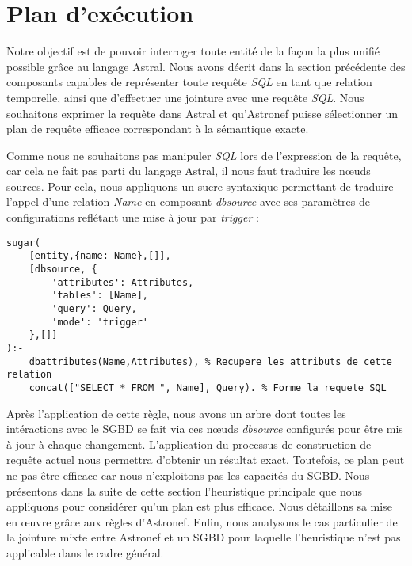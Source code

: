 \section{Plan d'exécution}\label{sec:contrib:asteroid:reecriture}
Notre objectif est de pouvoir interroger toute entité de la façon la plus unifié possible grâce au langage Astral. Nous avons décrit dans la section précédente des composants capables de représenter toute requête \textit{SQL} en tant que relation temporelle, ainsi que d'effectuer une jointure avec une requête \textit{SQL}. Nous souhaitons exprimer la requête dans Astral et qu'Astronef puisse sélectionner un plan de requête efficace correspondant à la sémantique exacte.

Comme nous ne souhaitons pas manipuler \textit{SQL} lors de l'expression de la requête, car cela ne fait pas parti du langage Astral, il nous faut traduire les nœuds sources. Pour cela, nous appliquons un sucre syntaxique permettant de traduire l'appel d'une relation \textit{Name} en composant \textit{dbsource} avec ses paramètres de configurations reflétant une mise à jour par \textit{trigger} :
\begin{lstlisting}
sugar(
    [entity,{name: Name},[]],
    [dbsource, {
        'attributes': Attributes,
        'tables': [Name],
        'query': Query,
        'mode': 'trigger'
    },[]]
):-
    dbattributes(Name,Attributes), % Recupere les attributs de cette relation
    concat(["SELECT * FROM ", Name], Query). % Forme la requete SQL
\end{lstlisting}
Après l'application de cette règle, nous avons un arbre dont toutes les intéractions avec le SGBD se fait via ces nœuds \textit{dbsource} configurés pour être mis à jour à chaque changement. L'application du processus de construction de requête actuel nous permettra d'obtenir un résultat exact. Toutefois, ce plan peut ne pas être efficace car nous n'exploitons pas les capacités du SGBD. Nous présentons dans la suite de cette section l'heuristique principale que nous appliquons pour considérer qu'un plan est plus efficace. Nous détaillons sa mise en œuvre grâce aux règles d'Astronef. Enfin, nous analysons le cas particulier de la jointure mixte entre Astronef et un SGBD pour laquelle l'heuristique n'est pas applicable dans le cadre général.

